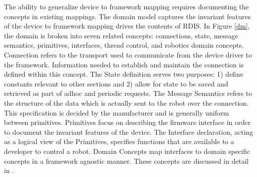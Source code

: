 The ability to generalize device to framework mapping requires documenting the concepts in existing mappings.  The domain model captures the invariant features of the device to framework mapping drives the contents of RDIS.  In Figure \ref{dm}, the domain is broken into seven related concepts: connections, state, message semantics, primitives, interfaces, thread control, and robotics domain concepts.  {\sc Connection} refers to the transport used to communicate from the device driver to the framework.  Information needed to establish and maintain the connection is defined within this concept. The {\sc State} definition serves two purposes: 1) define constants relevant to other sections and 2) allow for state to be saved and retrieved as part of adhoc and periodic requests.   The {\sc Message Semantics} refers to the structure of the data which is actually sent to the robot over the connection. This specification is decided by the manufacturer and is generally uniform between primitives.   {\sc Primitives} focus on describing the firmware interface in order to document the invariant features of the device.   The {\sc Interface} declaration, acting as a logical view of the {\sc Primitives},  specifies functions that are available to a developer to control a robot.   {\sc Domain Concepts} map interfaces to domain specific concepts in a framework agnostic manner.  These concepts are discussed in detail in \cite{Anderson2012}.




